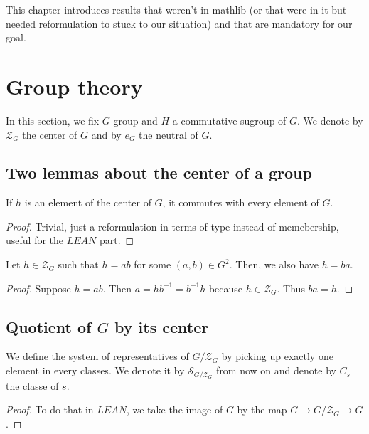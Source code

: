 This chapter introduces results that weren't in mathlib (or that were
in it but needed reformulation to stuck to our situation) and that are
mandatory for our goal.

\section{Group theory}
In this section, we fix $G$ group and $H$ a commutative sugroup of $G$.
We denote by $\mathcal{Z}_G$ the center of $G$ and by $e_G$ the neutral of $G$.

\subsection{Two lemmas about the center of a group}

\begin{proposition}
    \label{prop:center_mul_comm}
    \uses{}
    \leanok
    If $h$ is an element of the center of $G$, it commutes with every element of $G$.
\end{proposition}
    \begin{proof}
        \leanok
        Trivial, just a reformulation in terms of type instead of memebership, useful for the $LEAN$ part.
    \end{proof}

\begin{proposition}
    \label{prop:center_mul_simp}
    \leanok
    Let $h\in\mathcal{Z}_G$ such that $h=ab$ for some $(a,b)\in G^2$. Then, we also have
    $h=ba$.
\end{proposition}
\begin{proof}
    \leanok
    Suppose $h=ab$. Then $a=hb^{-1}=b^{-1}h$ because $h\in\mathcal{Z}_G$. Thus $ba=h$.
\end{proof}

\subsection{Quotient of $G$ by its center}

\begin{definition}
    \label{def:system_of_repr_center_set}
    \uses{}
    \leanok
    We define the system of representatives of $G/\mathcal{Z}_G$ by picking up exactly one element
    in every classes. We denote it by $\mathcal{S}_{G/\mathcal{Z}_G}$ from now on and denote
    by $C_s$ the classe of $s$.
    \begin{proof}
        \leanok
        To do that in $LEAN$, we take the image of $G$ by the map $G \rightarrow G/\mathcal{Z}_G\to G$.
    \end{proof}
\end{definition}

